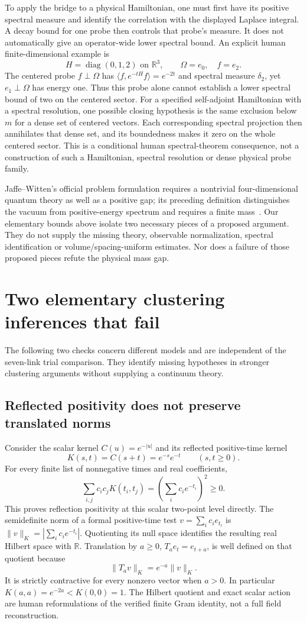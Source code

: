 \documentclass[11pt]{article}
\newcommand{\R}{\mathbb R}\newcommand{\E}{\mathbb E}
\begin{document}
To apply the bridge to a physical Hamiltonian, one must first have
its positive spectral measure and identify the correlation with the
displayed Laplace integral. A decay bound for one probe then controls
that probe's measure. It does not automatically give an operator-wide
lower spectral bound. An explicit human finite-dimensional example is
\[
 H=\operatorname{diag}(0,1,2)\text{ on }\R^3,\qquad
 \Omega=e_0,\quad f=e_2.
\]
The centered probe $f\perp\Omega$ has
$\langle f,e^{-tH}f\rangle=e^{-2t}$ and spectral measure $\delta_2$,
yet $e_1\perp\Omega$ has energy one. Thus this probe alone cannot
establish a lower spectral bound of two on the centered sector.
For a specified self-adjoint Hamiltonian with a spectral resolution,
one possible closing hypothesis is the same exclusion below $m$
for a dense set of centered vectors. Each corresponding spectral
projection then annihilates that dense set, and its boundedness
makes it zero on the whole centered sector. This is a conditional
human spectral-theorem consequence, not a construction of such a
Hamiltonian, spectral resolution or dense physical probe family.

Jaffe--Witten's official problem formulation requires a nontrivial
four-dimensional quantum theory as well as a positive gap; its
preceding definition distinguishes the vacuum from positive-energy
spectrum and requires a finite mass~\cite{JW}. Our elementary bounds
above isolate two necessary pieces of a proposed argument. They do
not supply the missing theory, observable normalization, spectral
identification or volume/spacing-uniform estimates. Nor does a
failure of those proposed pieces refute the physical mass gap.


\section{Two elementary clustering inferences that fail}
The following two checks concern different models and are independent
of the seven-link trial comparison. They identify missing hypotheses
in stronger clustering arguments without supplying a continuum theory.

\subsection*{Reflected positivity does not preserve translated norms}
Consider the scalar kernel $C(u)=e^{-|u|}$ and its reflected
positive-time kernel
\[
 K(s,t)=C(s+t)=e^{-s}e^{-t}\qquad(s,t\geq0).
\]
For every finite list of nonnegative times and real coefficients,
\[
 \sum_{i,j}c_i c_jK(t_i,t_j)
     =\left(\sum_i c_i e^{-t_i}\right)^2\geq0.
\]
This proves reflection positivity at this scalar two-point level
directly. The semidefinite norm of a formal positive-time test
$v=\sum_i c_i e_{t_i}$ is
$\|v\|_K=|\sum_i c_i e^{-t_i}|$. Quotienting its null space
identifies the resulting real Hilbert space with $\R$.
Translation by $a\geq0$, $T_a e_t=e_{t+a}$, is well defined on
that quotient because
\[
 \|T_av\|_K=e^{-a}\|v\|_K.
\]
It is strictly contractive for every nonzero vector when $a>0$.
In particular $K(a,a)=e^{-2a}<K(0,0)=1$. The Hilbert quotient
and exact scalar action are human reformulations of the verified
finite Gram identity, not a full field reconstruction.
\end{document}
